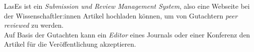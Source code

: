
LasEs ist ein \emph{Submission und Review Management System}, also eine Webseite bei der Wissenschaftler:innen Artikel hochladen können, um von Gutachtern \emph{peer reviewed} zu werden.\\
Auf Basis der Gutachten kann ein \emph{Editor} eines Journals oder einer Konferenz den Artikel für die Veröffentlichung akzeptieren.
